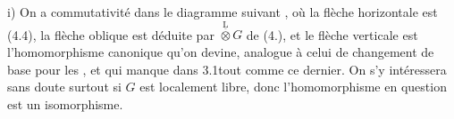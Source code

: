  i) On a commutativité dans le diagramme suivant
,
où la flèche horizontale est (4.4), la flèche oblique est déduite par $\overset{\underline{\mathrm{L}}}{\otimes}G$ de (4.), et le flèche verticale est l'homomorphisme canonique qu'on devine, analogue à celui de changement de base pour les \handwritten{$!$}, et qui manque dans 3.1\handwritten{(}tout comme ce dernier\handwritten{)}. On s'y intéressera sans doute surtout si $G$ est localement libre, donc l'homomorphisme en question est un isomorphisme.

